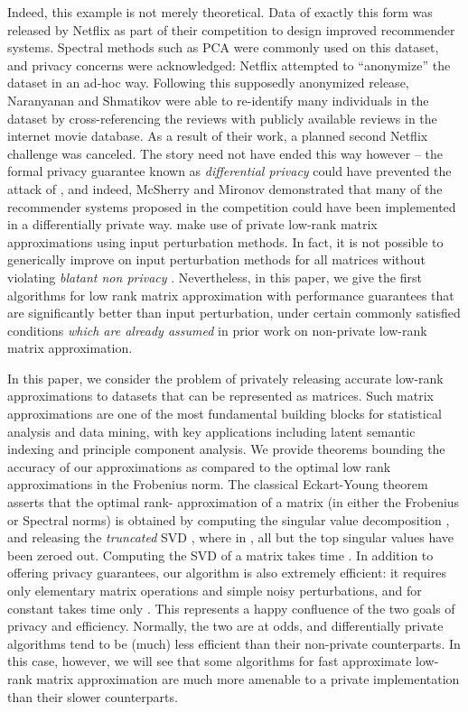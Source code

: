 \documentclass[letterpaper,11pt]{article}
\theoremstyle{definition}
\begin{document}
Indeed, this example is not merely theoretical. Data of exactly this form was
released by Netflix as part of their competition to design improved
recommender systems. Spectral methods such as PCA were commonly used on this
dataset, and privacy concerns were acknowledged: Netflix attempted to
``anonymize'' the dataset in an ad-hoc way. Following this supposedly
anonymized release, Naranyanan and Shmatikov \cite{NarayananS08} were able to
re-identify many individuals in the dataset by cross-referencing the reviews
with publicly available reviews in the internet movie database. As a result of
their work, a planned second Netflix challenge was canceled. The story need
not have ended this way however -- the formal privacy guarantee known as
\emph{differential privacy} could have prevented the attack of
\cite{NarayananS08}, and indeed, McSherry and Mironov \cite{McSherryM09}
demonstrated that many of the recommender systems proposed in the competition
could have been implemented in a differentially private way.
\cite{McSherryM09} make use of private low-rank matrix approximations using
input perturbation methods. In fact, it is not possible to generically improve
on input perturbation methods for all matrices without violating \emph{blatant
non privacy} \cite{DinurN03}. Nevertheless,  in this paper, we give the first
algorithms for low rank matrix approximation with performance guarantees that
are significantly better than input perturbation, under certain commonly
satisfied conditions \emph{which are already assumed} in prior work on
non-private low-rank matrix approximation.

In this paper, we consider the problem of privately releasing accurate
low-rank approximations to datasets that can be represented as matrices. Such
matrix approximations are one of the most fundamental building blocks for
statistical analysis and data mining, with key applications including latent
semantic indexing and principle component analysis. We provide theorems
bounding the accuracy of our approximations as compared to the optimal low
rank approximations in the Frobenius norm. The classical Eckart-Young theorem
asserts that the
optimal rank- approximation of a matrix  (in either the Frobenius or
Spectral norms) is obtained by computing the singular value decomposition , and releasing the \emph{truncated} SVD ,
where in , all but the top  singular values have been zeroed out.
Computing the SVD of a matrix takes time . In addition to offering
privacy guarantees, our algorithm is also extremely efficient: it requires
only elementary matrix operations and simple noisy perturbations, and for
constant  takes time only . This represents a happy confluence of
the two goals of privacy and efficiency. Normally, the two are at odds, and
differentially private algorithms tend to be (much) less efficient than their
non-private counterparts. In this case, however, we will see that some algorithms
for fast approximate low-rank matrix approximation are much more amenable
to a private implementation than their slower counterparts.
\end{document}
